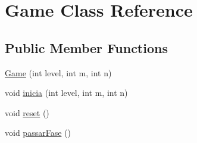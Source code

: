 \hypertarget{class_game}{\section{\-Game \-Class \-Reference}
\label{class_game}
}
\subsection*{\-Public \-Member \-Functions}
\begin{DoxyCompactItemize}
\item 
\hyperlink{class_game_af0c00524acfb97acbd67b6aeab39ff3c}{\-Game} (int level, int m, int n)
\item 
void \hyperlink{class_game_a04989357c8812b0b8ec9c6ad497e1b6d}{inicia} (int level, int m, int n)
\item 
void \hyperlink{class_game_a39bb2fd26b5ea6b164f28f9f6723582e}{reset} ()
\item 
void \hyperlink{class_game_a5b3d154e328181f01f94af12fb050788}{passar\-Fase} ()
\end{DoxyCompactItemize}
